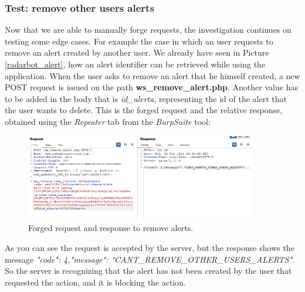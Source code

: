		\subsubsection{Test: remove other users alerts}
			\par Now that we are able to manually forge requests, the investigation continues on testing some edge cases. For example the case in which an user requests to remove an alert created by another user. We already have seen in Picture \ref{radarbot_alert}, how an alert identifier can be retrieved while using the application. \newline
			When the user asks to remove an alert that he himself created, a new POST request is issued on the path \textbf{ws\_remove\_alert.php}. Another value has to be added in the body that is \textit{id\_alerta}, representing the id of the alert that the user wants to delete. This is the forged request and the relative response, obtained using the \textit{Repeater} tab from the \textit{BurpSuite} tool:
			\begin{figure}[H]
				\centering
				\includegraphics[width=0.9\textwidth]{images/radarbot_removealert.png}
				\caption{Forged request and response to remove alerts.}
			\end{figure}
			\par As you can see the request is accepted by the server, but the response shows the message \textit
{"code": 4,"message": "CANT\_REMOVE\_OTHER\_USERS\_ALERTS"}. So the server is recognizing that the alert has not been created by the user that requested the action, and it is blocking the action.

